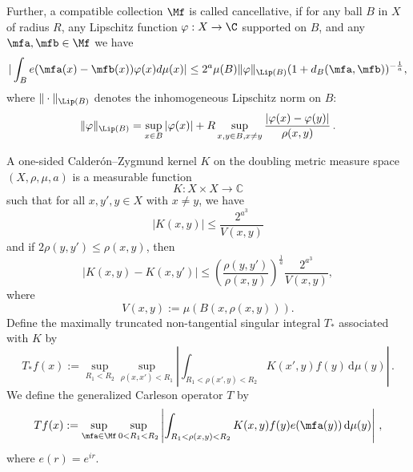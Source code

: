 Further, a compatible collection $\Mf$ is called cancellative, if
for any ball $B$ in $X$ of radius $R$, any Lipschitz function $\varphi: X\to \C$
supported on $B$, and any $\mfa,\mfb\in \Mf$ we have
\begin{equation}
    \label{eq-vdc-cond}
    |\int_B e(\mfa(x)-{\mfb(x)}) \varphi(x) d\mu(x)|\le 2^a \mu(B)\|\varphi\|_{\Lip(B)}
(1+d_B(\mfa,\mfb))^{-\frac{1}{a}},
\end{equation}
where $\|\cdot\|_{\Lip(B)}$ denotes the inhomogeneous Lipschitz norm on $B$:
$$
    \|\varphi\|_{\Lip(B)} = \sup_{x \in B} |\varphi(x)| + R \sup_{x,y \in B, x \neq y} \frac{|\varphi(x) - \varphi(y)|}{\rho(x,y)}\,.
$$

A one-sided Calder\'on--Zygmund kernel $K$ on the doubling metric measure space $(X, \rho, \mu, a)$ is a measurable function
\begin{equation}\label{eqkernel0}
  K:X\times X\to \mathbb{C}
\end{equation}
such that for all $x,y',y\in X$ with $x\neq y$, we have
\begin{equation}\label{eqkernel-size}
    |K(x,y)| \leq \frac{2^{a^3}}{V(x,y)}
\end{equation}
and if $2\rho(y,y') \leq \rho(x,y)$, then
\begin{equation}
  \label{eqkernel-y-smooth}
  |K(x,y) - K(x,y')| \leq \left(\frac{\rho(y,y')}{\rho(x,y)}\right)^{\frac{1}{a}}\frac{2^{a^3}}{V(x,y)},
\end{equation}
where \[V(x,y):=\mu(B(x,\rho(x,y))).\]
Define the maximally truncated non-tangential singular integral $T_{*}$ associated with $K$ by
\begin{equation}
    \label{def-tang-unm-op}
    T_{*}f(x):=\sup_{R_1 < R_2} \sup_{\rho(x,x')<R_1} \left|\int_{R_1< \rho(x',y) < R_2} K(x',y) f(y) \, \mathrm{d}\mu(y) \right|\,.
\end{equation}
We define the generalized Carleson operator $T$ by
\begin{equation}
    \label{def-main-op}
    Tf(x):=\sup_{\mfa\in\Mf} \sup_{0 < R_1 < R_2}\left| \int_{R_1 < \rho(x,y) < R_2} K(x,y) f(y) e(\mfa(y)) \, \mathrm{d}\mu(y) \right|\, ,
\end{equation}
where $e(r)=e^{ir}$.

